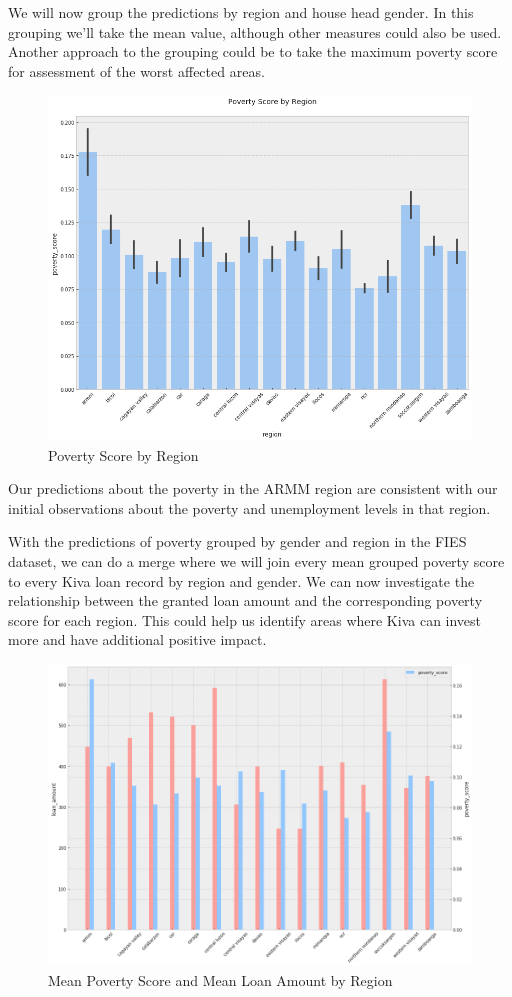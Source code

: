 \documentclass{article}
\begin{document}
We will now group the predictions by region and house head gender. In this grouping we'll take the mean value, although other measures could also be used. Another approach to the grouping could be to take the maximum poverty score for assessment of the worst affected areas.

\begin{figure}[H]
\caption{Poverty Score by Region}
\centering
\includegraphics[width = 0.7 \textwidth]{poverty_score_region}
\end{figure}

Our predictions about the poverty in the ARMM region are consistent with our initial observations about the poverty and unemployment levels in that region.

With the predictions of poverty grouped by gender and region in the FIES dataset, we can do a merge where we will join every mean grouped poverty score to every Kiva loan record by region and gender. We can now investigate the relationship between the granted loan amount and the corresponding poverty score for each region. This could help us identify areas where Kiva can invest more and have additional positive impact.

\begin{figure}[H]
\caption{Mean Poverty Score and Mean Loan Amount by Region}
\centering
\includegraphics[width = 0.7 \textwidth]{poverty_score_loan_region}
\end{figure}
\end{document}
